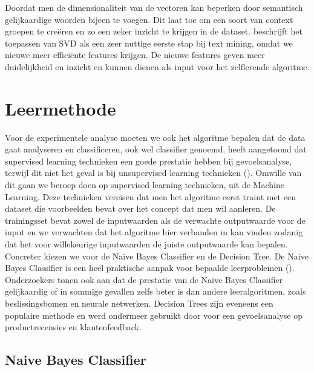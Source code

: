 Doordat men de dimensionaliteit van de vectoren kan beperken door semantisch gelijkaardige woorden bijeen te voegen. Dit laat toe om een soort van context groepen te cre\"eren en zo een zeker inzicht te krijgen in de dataset. \cite{maas-EtAl:2011:ACL-HLT2011} beschrijft het toepassen van SVD als een zeer nuttige eerste stap bij text mining, omdat we nieuwe meer effici\"ente features krijgen. De nieuwe features geven meer duidelijkheid en inzicht en kunnen dienen als input voor het zelflerende algoritme.

\section{Leermethode}\label{Leermethode}

Voor de experimentele analyse moeten we ook het algoritme bepalen dat de data gaat analyseren en classificeren, ook wel classifier genoemd. \cite{ye2009sentiment} heeft aangetoond dat supervised learning technieken een goede prestatie hebben bij gevoelsanalyse, terwijl dit niet het geval is bij unsupervised learning technieken (\cite{rothfels2010unsupervised}).
Omwille van dit gaan we beroep doen op supervised learning technieken, uit de Machine Learning. Deze technieken vereisen dat men het algoritme eerst traint met een dataset die voorbeelden bevat over het concept dat men wil aanleren. De trainingsset bevat zowel de inputwaarden als de verwachte outputwaarde voor de input en we verwachten dat het algoritme hier verbanden in kan vinden zodanig dat het voor willekeurige inputwaarden de juiste outputwaarde kan bepalen.\\

Concreter kiezen we voor de Naive Bayes Classifier en de Decision Tree. De Naive Bayes Classifier is een heel praktische aanpak voor bepaalde leerproblemen (\cite{mitchell1997machine}). Onderzoekers \cite{Michie94machinelearning} tonen ook aan dat de prestatie van de Naive Bayes Classifier gelijkaardig of in sommige gevallen zelfs beter is dan andere leeralgoritmen, zoals beslissingsbomen en neurale netwerken. Decision Trees zijn eveneens een populaire methode en werd ondermeer gebruikt door \cite{zhang2008sentiment} voor een gevoelsanalyse op productrecensies en klantenfeedback.

\subsection{Naive Bayes Classifier}\label{Naive Bayes Classifier}

